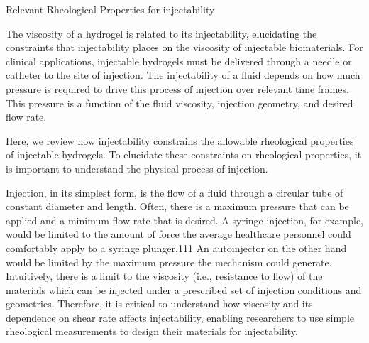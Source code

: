 \documentclass[../../main-notes.tex]{subfiles}
\begin{document}
Relevant Rheological Properties for injectability 

The viscosity of a hydrogel is related to its injectability, elucidating the constraints that injectability places on the viscosity of injectable biomaterials.  
For clinical applications, injectable hydrogels must be delivered through a needle or catheter to the site of injection.  
The injectability of a fluid depends on how much pressure is required to drive this process of injection over relevant time frames.  
This pressure is a function of the fluid viscosity, injection geometry, and desired flow rate.   

Here, we review how injectability constrains the allowable rheological properties of injectable hydrogels.  
To elucidate these constraints on rheological properties, it is important to understand the physical process of injection.   

Injection, in its simplest form, is the flow of a fluid through a circular tube of constant diameter and length.  
Often, there is a maximum pressure that can be applied and a minimum flow rate that is desired.  
A syringe injection, for example, would be limited to the amount of force the average healthcare  personnel could comfortably apply to a syringe plunger.111  
An autoinjector on the other hand would be limited by the maximum pressure the mechanism could generate.  
Intuitively, there is a limit to the viscosity (i.e., resistance to flow) of the materials which can be injected under a prescribed set of injection conditions and geometries.  
Therefore, it is critical to understand how viscosityand its dependence on shear rate affects injectability, enabling researchers to use simple rheological measurements to design their materials for injectability.  
\end{document}
